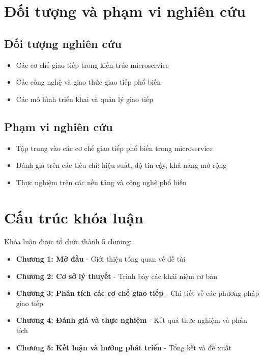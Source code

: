 \section{Đối tượng và phạm vi nghiên cứu}
\subsection{Đối tượng nghiên cứu}
\begin{itemize}
    \item Các cơ chế giao tiếp trong kiến trúc microservice
    \item Các công nghệ và giao thức giao tiếp phổ biến
    \item Các mô hình triển khai và quản lý giao tiếp
\end{itemize}

\subsection{Phạm vi nghiên cứu}
\begin{itemize}
    \item Tập trung vào các cơ chế giao tiếp phổ biến trong microservice
    \item Đánh giá trên các tiêu chí: hiệu suất, độ tin cậy, khả năng mở rộng
    \item Thực nghiệm trên các nền tảng và công nghệ phổ biến
\end{itemize}

\section{Cấu trúc khóa luận}
Khóa luận được tổ chức thành 5 chương:

\begin{itemize}
    \item \textbf{Chương 1: Mở đầu} - Giới thiệu tổng quan về đề tài
    \item \textbf{Chương 2: Cơ sở lý thuyết} - Trình bày các khái niệm cơ bản
    \item \textbf{Chương 3: Phân tích các cơ chế giao tiếp} - Chi tiết về các phương pháp giao tiếp
    \item \textbf{Chương 4: Đánh giá và thực nghiệm} - Kết quả thực nghiệm và phân tích
    \item \textbf{Chương 5: Kết luận và hướng phát triển} - Tổng kết và đề xuất
\end{itemize} 